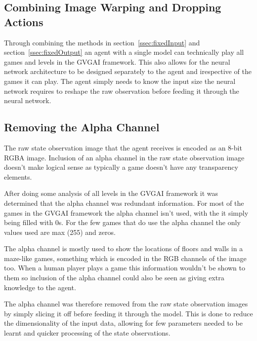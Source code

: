 \subsection*{Combining Image Warping and Dropping Actions}
Through combining the methods in section~\ref{ssec:fixedInput} and section~\ref{ssec:fixedOutput} an agent with a single model can technically play all games and levels in the GVGAI framework.
This also allows for the neural network architecture to be designed separately to the agent and irespective of the games it can play.
The agent simply needs to know the input size the neural network requires to reshape the raw observation before feeding it through the neural network.

\subsection{Removing the Alpha Channel}
The raw state observation image that the agent receives is encoded as an 8-bit RGBA image.
Inclusion of an alpha channel in the raw state observation image doesn't make logical sense as typically a game doesn't have any transparency elements.
\par
After doing some analysis of all levels in the GVGAI framework it was determined that the alpha channel was redundant information.
For most of the games in the GVGAI framework the alpha channel isn't used, with the it simply being filled with 0s.
For the few games that do use the alpha channel the only values used are max (255) and zeros.
\par
The alpha channel is mostly used to show the locations of floors and walls in a maze-like games, something which is encoded in the RGB channels of the image too.
When a human player plays a game this information wouldn't be shown to them so inclusion of the alpha channel could also be seen as giving extra knowledge to the agent.
\par
The alpha channel was therefore removed from the raw state observation images by simply slicing it off before feeding it through the model.
This is done to reduce the dimensionality of the input data, allowing for few parameters needed to be learnt and quicker processing of the state observations.

